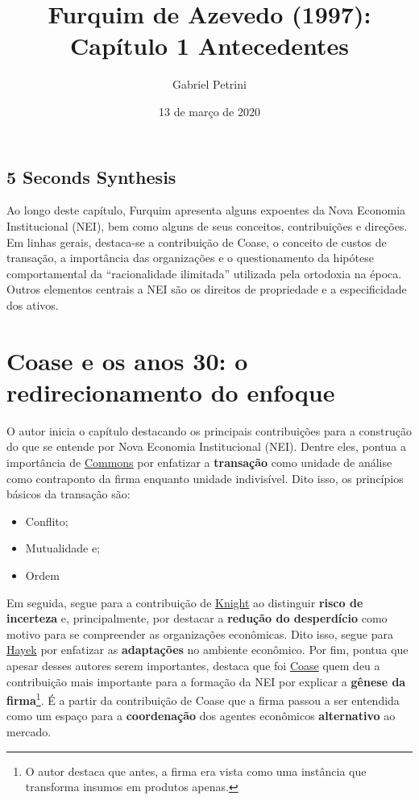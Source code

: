 \documentclass[9pt,twocolumn,twoside,lineno]{style}
\title{Furquim de Azevedo (1997): Capítulo 1 Antecedentes}
\date{13 de março de 2020}
\author[$\ddagger$]{Gabriel Petrini}
\affil[$\ddagger$]{Doutorando no instituto de Economia da Unicamp}
\begin{document}
\maketitle
\articletypemark
\marginmark
\thispagestyle{firststyle}

	\begin{sigstatement}
		\sffamily
		{%
			\begin{mdframed}[style=stylesigstyle]%
				\section*{5 Seconds Synthesis}%
	Ao longo deste capítulo, Furquim apresenta alguns expoentes da Nova Economia Institucional (NEI), bem como alguns de seus conceitos, contribuições e direções. Em linhas gerais, destaca-se a contribuição de Coase, o conceito de custos de transação, a importância das organizações e o questionamento da hipótese comportamental da ``racionalidade ilimitada'' utilizada pela ortodoxia na época. Outros elementos centrais a NEI são os direitos de propriedade e a especificidade dos ativos.
		\end{mdframed}}
\end{sigstatement}

	
\section{Coase e os anos 30: o redirecionamento do enfoque}

O autor inicia o capítulo destacando os principais contribuições para a construção do que se entende por Nova Economia Institucional (NEI). Dentre eles, pontua a importância de \underline{Commons} por enfatizar a \textbf{transação} como unidade de análise como contraponto da firma enquanto unidade indivisível. Dito isso, os princípios básicos da transação são:

\begin{itemize}
	\item Conflito;
	\item Mutualidade e;
	\item Ordem
\end{itemize}	
Em seguida, segue para a contribuição de \underline{Knight} ao distinguir \textbf{risco de incerteza} e, principalmente, por destacar a \textbf{redução do desperdício} como motivo para se compreender as organizações econômicas. Dito isso, segue para \underline{Hayek} por enfatizar as \textbf{adaptações} no ambiente econômico. Por fim, pontua que apesar desses autores serem importantes, destaca que foi \underline{Coase} quem deu a contribuição mais importante para a formação da NEI por explicar a \textbf{gênese da firma}\footnote{O autor destaca que antes, a firma era vista como uma instância que transforma insumos em produtos apenas.}.
É a partir da contribuição de Coase que a firma passou a ser entendida como um espaço para a \textbf{coordenação} dos agentes econômicos \textbf{alternativo} ao mercado.
\end{document}
